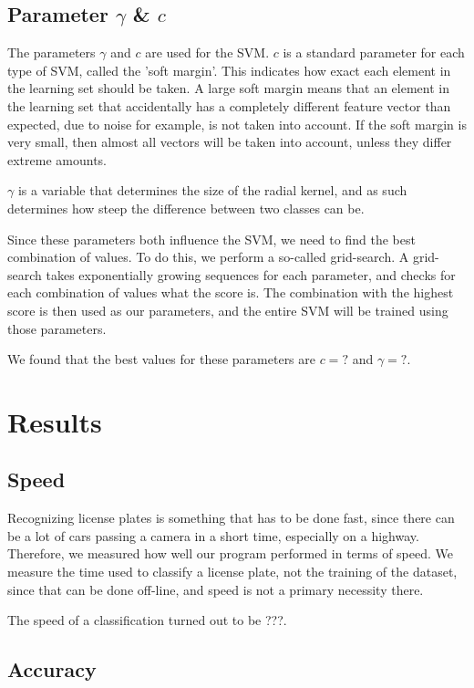 \documentclass[a4paper]{article}
\begin{document}
\subsection{Parameter $\gamma$ \& $c$}

The parameters $\gamma$ and $c$ are used for the SVM. $c$ is a standard
parameter for each type of SVM, called the 'soft margin'. This indicates how
exact each element in the learning set should be taken. A large soft margin
means that an element in the learning set that accidentally has a completely
different feature vector than expected, due to noise for example, is not taken
into account. If the soft margin is very small, then almost all vectors will be
taken into account, unless they differ extreme amounts.

$\gamma$ is a variable that determines the size of the radial kernel, and as
such determines how steep the difference between two classes can be.

Since these parameters both influence the SVM, we need to find the best
combination of values. To do this, we perform a so-called grid-search. A grid-
search takes exponentially growing sequences for each parameter, and checks for
each combination of values what the score is. The combination with the highest
score is then used as our parameters, and the entire SVM will be trained using
those parameters.

We found that the best values for these parameters are $c = ?$ and $\gamma = ?$.


\section{Results}


\subsection{Speed}

Recognizing license plates is something that has to be done fast, since there
can be a lot of cars passing a camera in a short time, especially on a highway.
Therefore, we measured how well our program performed in terms of speed. We
measure the time used to classify a license plate, not the training of the
dataset, since that can be done off-line, and speed is not a primary necessity
there.

The speed of a classification turned out to be ???.


\subsection{Accuracy}
\end{document}
